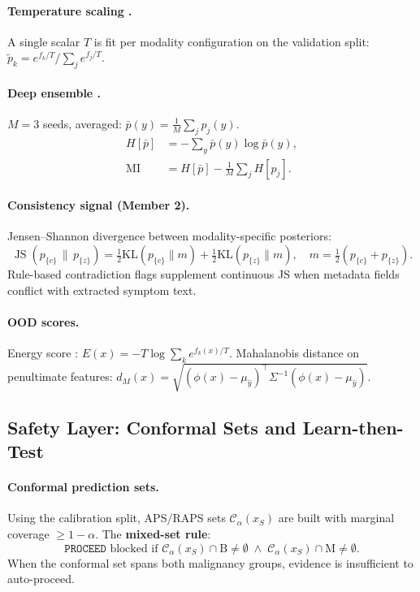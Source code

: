 \documentclass[conference]{IEEEtran}
\DeclareMathOperator{\JS}{JS}
\newcommand{\1}{\mathbf{1}}
\begin{document}
\paragraph{Temperature scaling \cite{guo2017calibration}.}
A single scalar $T$ is fit per modality configuration on the validation
split: $\tilde{p}_k = e^{f_k/T} / \sum_j e^{f_j/T}$.

\paragraph{Deep ensemble \cite{lakshminarayanan2017ensembles}.}
$M=3$ seeds, averaged: $\bar{p}(y)=\frac{1}{M}\sum_j p_j(y)$.
\begin{align}
  H[\bar{p}] &= -\sum_y \bar{p}(y)\log\bar{p}(y), \label{eq:entropy}\\
  \text{MI}  &= H[\bar{p}] - \tfrac{1}{M}\textstyle\sum_j H[p_j]. \label{eq:mi}
\end{align}

\paragraph{Consistency signal (Member 2).}
Jensen--Shannon divergence between modality-specific posteriors:
\begin{equation}
  \JS(p_{\{c\}} \,\|\, p_{\{z\}}) =
    \tfrac{1}{2}\text{KL}(p_{\{c\}} \| m) +
    \tfrac{1}{2}\text{KL}(p_{\{z\}} \| m),\quad
  m = \tfrac{1}{2}(p_{\{c\}}+p_{\{z\}}).
  \label{eq:js}
\end{equation}
Rule-based contradiction flags supplement continuous JS when metadata fields
conflict with extracted symptom text.

\paragraph{OOD scores.}
Energy score \cite{liu2020energy}:
$E(x) = -T\log\sum_{k} e^{f_k(x)/T}.$
Mahalanobis distance \cite{lee2018mahalanobis} on penultimate features:
$d_M(x) = \sqrt{(\phi(x)-\mu_{\hat{y}})^\top \Sigma^{-1} (\phi(x)-\mu_{\hat{y}})}.$

\subsection{Safety Layer: Conformal Sets and Learn-then-Test}

\paragraph{Conformal prediction sets.}
Using the calibration split, APS/RAPS sets $\mathcal{C}_\alpha(x_S)$ are
built with marginal coverage $\geq 1-\alpha$. The \textbf{mixed-set rule}:
\begin{equation}
  \texttt{PROCEED} \text{ blocked if } \mathcal{C}_\alpha(x_S) \cap \text{B} \neq \emptyset
  \;\wedge\; \mathcal{C}_\alpha(x_S) \cap \text{M} \neq \emptyset.
  \label{eq:mixed_rule}
\end{equation}
When the conformal set spans both malignancy groups, evidence is
insufficient to auto-proceed.
\end{document}
